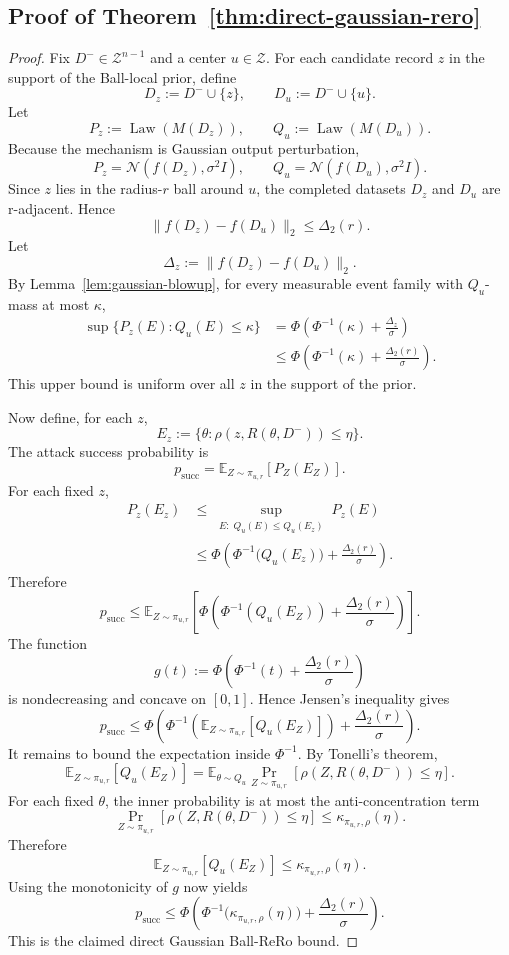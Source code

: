 \documentclass[conference,compsoc]{IEEEtran}
\DeclareMathOperator{\Law}{Law}
\begin{document}
\subsection{Proof of Theorem~\ref{thm:direct-gaussian-rero}}

\begin{proof}
Fix $D^-\in\mathcal{Z}^{n-1}$ and a center $u\in\mathcal{Z}$. For each candidate record $z$ in the support of the Ball-local prior, define
\[
D_z:=D^-\cup\{z\},
\qquad
D_u:=D^-\cup\{u\}.
\]
Let
\[
P_z:=\Law(M(D_z)),
\qquad
Q_u:=\Law(M(D_u)).
\]
Because the mechanism is Gaussian output perturbation,
\[
P_z=\mathcal{N}(f(D_z),\sigma^2 I),
\qquad
Q_u=\mathcal{N}(f(D_u),\sigma^2 I).
\]
Since $z$ lies in the radius-$r$ ball around $u$, the completed datasets $D_z$ and $D_u$ are r-adjacent. Hence
\[
\|f(D_z)-f(D_u)\|_2\le \Delta_2(r).
\]
Let
\[
\Delta_z:=\|f(D_z)-f(D_u)\|_2.
\]
By Lemma~\ref{lem:gaussian-blowup}, for every measurable event family
with $Q_u$-mass at most $\kappa$,
\[
\begin{aligned}
\sup\{P_z(E):Q_u(E)\le \kappa\}
&=
\Phi\!\left(
\Phi^{-1}(\kappa)+\frac{\Delta_z}{\sigma}
\right) \\
&\le
\Phi\!\left(
\Phi^{-1}(\kappa)+\frac{\Delta_2(r)}{\sigma}
\right).
\end{aligned}
\]
This upper bound is uniform over all $z$ in the support of the prior.

Now define, for each $z$,
\[
E_z:=\{\theta: \rho(z,R(\theta,D^-))\le \eta\}.
\]
The attack success probability is
\[
p_{\mathrm{succ}}
=
\mathbb{E}_{Z\sim\pi_{u,r}}[P_Z(E_Z)].
\]
For each fixed $z$,
\[
\begin{aligned}
P_z(E_z)
&\le
\sup_{\substack{E:\; Q_u(E)\le Q_u(E_z)}} P_z(E) \\
&\le
\Phi\!\left(
    \Phi^{-1}\!\bigl(Q_u(E_z)\bigr)
    + \frac{\Delta_2(r)}{\sigma}
\right).
\end{aligned}
\]
Therefore
\[
p_{\mathrm{succ}}
\le
\mathbb{E}_{Z\sim\pi_{u,r}}
\left[
\Phi\!\left(\Phi^{-1}(Q_u(E_Z))+\frac{\Delta_2(r)}{\sigma}\right)
\right].
\]
The function
\[
g(t):=\Phi\!\left(\Phi^{-1}(t)+\frac{\Delta_2(r)}{\sigma}\right)
\]
is nondecreasing and concave on $[0,1]$. Hence Jensen's inequality gives
\[
p_{\mathrm{succ}}
\le
\Phi\!\left(
\Phi^{-1}\!\left(\mathbb{E}_{Z\sim\pi_{u,r}}[Q_u(E_Z)]\right)+\frac{\Delta_2(r)}{\sigma}
\right).
\]
It remains to bound the expectation inside $\Phi^{-1}$. By Tonelli's theorem,
\[
\mathbb{E}_{Z\sim\pi_{u,r}}[Q_u(E_Z)]
=
\mathbb{E}_{\theta\sim Q_u}
\Pr_{Z\sim\pi_{u,r}}[\rho(Z,R(\theta,D^-))\le \eta].
\]
For each fixed $\theta$, the inner probability is at most the anti-concentration term
\[
\Pr_{Z\sim\pi_{u,r}}[\rho(Z,R(\theta,D^-))\le \eta]
\le
\kappa_{\pi_{u,r},\rho}(\eta).
\]
Therefore
\[
\mathbb{E}_{Z\sim\pi_{u,r}}[Q_u(E_Z)]
\le
\kappa_{\pi_{u,r},\rho}(\eta).
\]
Using the monotonicity of $g$ now yields
\[
p_{\mathrm{succ}}
\le
\Phi\!\left(
\Phi^{-1}\!\big(\kappa_{\pi_{u,r},\rho}(\eta)\big)+\frac{\Delta_2(r)}{\sigma}
\right).
\]
This is the claimed direct Gaussian Ball-ReRo bound.
\end{proof}
\end{document}
